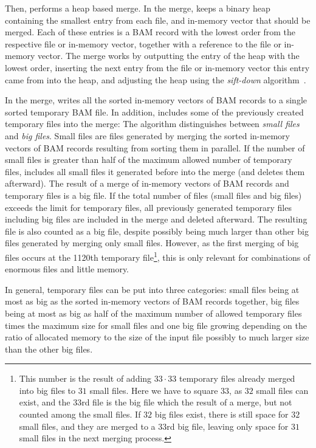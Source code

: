 Then, \sort performs a heap based merge. In the merge, \sort keeps a binary heap containing the smallest entry from each file, and in-memory vector that should be merged. Each of these entries is a BAM record with the lowest order from the respective file or in-memory vector, together with a reference to the file or in-memory vector. The merge works by outputting the entry of the heap with the lowest order, inserting the next entry from the file or in-memory vector this entry came from into the heap, and adjusting the heap using the \textit{sift-down} algorithm~\cite{bojesen_performance_1999}. 

In the merge, \sort writes all the sorted in-memory vectors of BAM records to a single sorted temporary BAM file. In addition, \sort includes some of the previously created temporary files into the merge: The algorithm distinguishes between \textit{small files} and \textit{big files}. Small files are files generated by merging the sorted in-memory vectors of BAM records resulting from sorting them in parallel. If the number of small files is greater than half of the maximum allowed number of temporary files, \sort includes all small files it generated before into the merge (and deletes them afterward). The result of a merge of in-memory vectors of BAM records and temporary files is a big file. If the total number of files (small files and big files) exceeds the limit for temporary files, all previously generated temporary files including big files are included in the merge and deleted afterward. The resulting file is also counted as a big file, despite possibly being much larger than other big files generated by merging only small files. However, as the first merging of big files occurs at the 1120th temporary file\footnote{\label{limitReaching}This number is the result of adding $33 \cdot 33$ temporary files already merged into big files to $31$ small files. Here we have to square $33$, as $32$ small files can exist, and the $33$rd file is the big file which the result of a merge, but not counted among the small files. If $32$ big files exist, there is still space for $32$ small files, and they are merged to a $33$rd big file, leaving only space for $31$ small files in the next merging process.}, this is only relevant for combinations of enormous files and little memory. 

In general, temporary files can be put into three categories: small files being at most as big as the sorted in-memory vectors of BAM records together, big files being at most as big as half of the maximum number of allowed temporary files times the maximum size for small files and one big file growing depending on the ratio of allocated memory to the size of the input file possibly to much larger size than the other big files.

